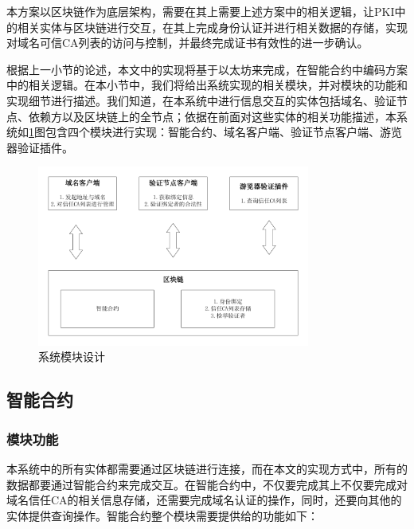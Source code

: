 本方案以区块链作为底层架构，需要在其上需要上述方案中的相关逻辑，让PKI中的相关实体与区块链进行交互，在其上完成身份认证并进行相关数据的存储，实现对域名可信CA列表的访问与控制，并最终完成证书有效性的进一步确认。

根据上一小节的论述，本文中的实现将基于以太坊来完成，在智能合约中编码方案中的相关逻辑。在本小节中，我们将给出系统实现的相关模块，并对模块的功能和实现细节进行描述。我们知道，在本系统中进行信息交互的实体包括域名、验证节点、依赖方以及区块链上的全节点；依据在前面对这些实体的相关功能描述，本系统如\ref{fig:module}图包含四个模块进行实现：智能合约、域名客户端、验证节点客户端、游览器验证插件。

\begin{figure}[htbp]
 	\centering
 	\includegraphics[width = 0.8\textwidth]{img/module}
 	\caption{系统模块设计}\label{fig:module}
\end{figure}


\subsection{智能合约}

\subsubsection{模块功能}

本系统中的所有实体都需要通过区块链进行连接，而在本文的实现方式中，所有的数据都要通过智能合约来完成交互。在智能合约中，不仅要完成其上不仅要完成对域名信任CA的相关信息存储，还需要完成域名认证的操作，同时，还要向其他的实体提供查询操作。智能合约整个模块需要提供给的功能如下：

